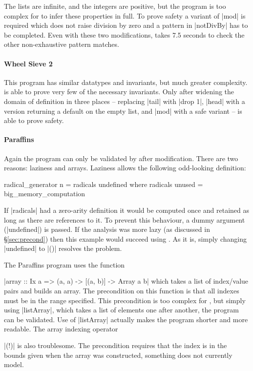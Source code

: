 The lists are infinite, and the integers are positive, but the program is too complex for \catch{} to infer these properties in full. To prove safety a variant of |mod| is required which does not raise division by zero and a pattern in |notDivBy| has to be completed. Even with these two modifications, \catch{} takes 7.5 seconds to check the other non-exhaustive pattern matches.


\paragraph{Wheel Sieve 2}

This program has similar datatypes and invariants, but much greater complexity. \catch{} is able to prove very few of the necessary invariants. Only after widening the domain of definition in three places -- replacing |tail| with |drop 1|, |head| with a version returning a default on the empty list, and |mod| with a safe variant -- is \catch{} able to prove safety.


\paragraph{Paraffins}

Again the program can only be validated by \catch{} after modification. There are two reasons: laziness and arrays. Laziness allows the following odd-looking definition:

\begin{comment}
\begin{code}
big_memory_computation = undefined
\end{code}
\end{comment}

\begin{code}
radical_generator n = radicals undefined
  where radicals unused = big_memory_computation
\end{code}

If |radicals| had a zero-arity definition it would be computed once and retained as long as there are references to it. To prevent this behaviour, a dummy argument (|undefined|) is passed. If the analysis was more lazy (as discussed in \S\ref{sec:precond}) then this example would succeed using \catch{}. As it is, simply changing |undefined| to |()| resolves the problem.

The Paraffins program uses the function \ignore|array :: Ix a => (a, a) -> [(a, b)] -> Array a b| which takes a list of index/value pairs and builds an array. The precondition on this function is that all indexes must be in the range specified. This precondition is too complex for \catch{}, but simply using |listArray|, which takes a list of elements one after another, the program can be validated. Use of |listArray| actually makes the program shorter and more readable. The array indexing operator \ignore|(!)| is also troublesome. The precondition requires that the index is in the bounds given when the array was constructed, something \catch{} does not currently model.


